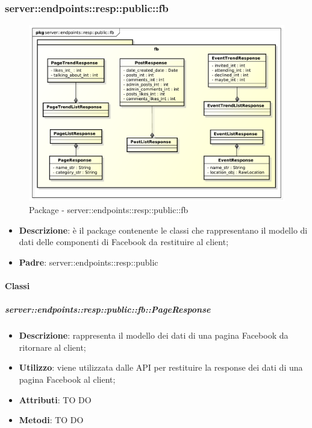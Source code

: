 \subsubsection{server::endpoints::resp::public::fb} %
\label{ssub:bdsm_app_server_endpoints_resp_public_fb}
\begin{figure}[!htbp]
	\centering
	\centerline{\includegraphics[scale=0.55]{./images/server/resp_fb.pdf}}
	\caption{Package - server::endpoints::resp::public::fb}
\end{figure}

\begin{itemize}
  \item \textbf{Descrizione}: è il package contenente le classi che rappresentano il modello di dati delle componenti di Facebook da restituire al client;
  \item \textbf{Padre}: server::endpoints::resp::public
\end{itemize}

	\paragraph{Classi} %

    \subparagraph{server::endpoints::resp::public::fb::PageResponse} %
    \label{subp:bdsm_app_server_endpoints_resp_public_fb_pageresponse}
    \begin{itemize}
      \item \textbf{Descrizione}: rappresenta il modello dei dati di una pagina Facebook da ritornare al client;
      \item \textbf{Utilizzo}: viene utilizzata dalle API per restituire la response dei dati di una pagina Facebook al client;
      
	  \item \textbf{Attributi}: TO DO
	  \item \textbf{Metodi}: TO DO
      \end{itemize}

